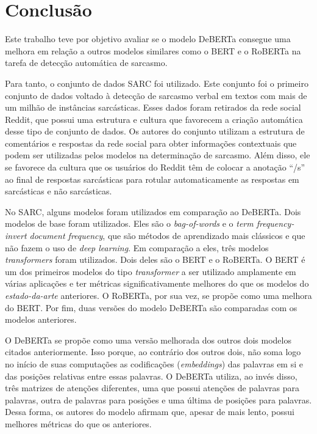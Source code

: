 

\chapter{Conclusão}%
\label{cha:conclusao}

Este trabalho teve por objetivo avaliar se o modelo DeBERTa consegue uma melhora
em relação a outros modelos similares como o BERT e o RoBERTa na tarefa de
detecção automática de sarcasmo.

Para tanto, o conjunto de dados SARC foi utilizado. Este conjunto foi o primeiro
conjunto de dados voltado à detecção de sarcasmo verbal em textos com mais de um
milhão de instâncias sarcásticas. Esses dados foram retirados da rede social
Reddit, que possui uma estrutura e cultura que favorecem a criação automática
desse tipo de conjunto de dados. Os autores do conjunto utilizam a estrutura de
comentários e respostas da rede social para obter informações contextuais que
podem ser utilizadas pelos modelos na determinação de sarcasmo. Além disso, ele
se favorece da cultura que os usuários do Reddit têm de colocar a anotação
``/s'' ao final de respostas sarcásticas para rotular automaticamente as
respostas em sarcásticas e não sarcásticas.

No SARC, alguns modelos foram utilizados em comparação ao DeBERTa. Dois modelos
de base foram utilizados. Eles são o \textit{bag-of-words} e o \textit{term
frequency-invert document frequency}, que são métodos de aprendizado mais
clássicos e que não fazem o uso de \textit{deep learning}. Em comparação a eles,
três modelos \textit{transformers} foram utilizados. Dois deles são o
BERT e o RoBERTa. O BERT é um dos primeiros modelos do tipo \textit{transformer}
a ser utilizado amplamente em várias aplicações e ter métricas
significativamente melhores do que os modelos do \textit{estado-da-arte}
anteriores. O RoBERTa, por sua vez, se propõe como uma melhora do BERT. Por fim,
duas versões do modelo DeBERTa são comparadas com os modelos anteriores.

O DeBERTa se propõe como uma versão melhorada dos outros dois modelos citados
anteriormente. Isso porque, ao contrário dos outros dois, não soma logo no
início de suas computações as codificações (\textit{embeddings}) das palavras em
si e das posições relativas entre essas palavras. O DeBERTa utiliza, ao invés
disso, três matrizes de atenções diferentes, uma que possui atenções de palavras
para palavras, outra de palavras para posições e uma última de posições para
palavras. Dessa forma, os autores do modelo afirmam que, apesar de mais lento,
possui melhores métricas do que os anteriores.

